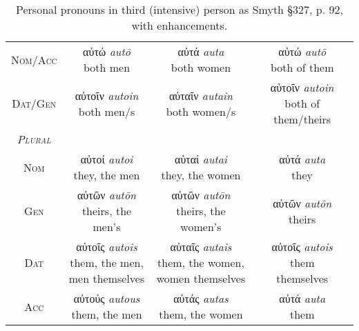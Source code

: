 \documentclass[10pt]{memoir}
\newcommand{\tsc}[1]{\textsc{#1}}
\newcommand{\grc}[1]{\fontspec{Inter}#1}
\newcommand{\trc}[1]{\textit{\fontspec{Tinos}#1}}
\begin{document}
\begin{table}[H]
\begin{tabular}{c|ccc}
            \tsc{Nom/Acc} & \makecell{\grc{αὐτώ} \trc{autō} \\ \small both men} & \makecell{\grc{αὐτά} \trc{auta} \\ \small both women} & \makecell{\grc{αὐτώ} \trc{autō} \\ \small both of them} \\
            \tsc{Dat/Gen} & \makecell{\grc{αὐτοῖν} \trc{autoin} \\ \small both men/s} & \makecell{\grc{αὐταῖν} \trc{autain} \\ \small both women/s} & \makecell{\grc{αὐτοῖν} \trc{autoin} \\ \small both of them/theirs} \\
            \hline
            \emph{\tsc{Plural}} \\
            \tsc{Nom} & \makecell{\grc{αὐτοί} \trc{autoi} \\ \small they, the men} & \makecell{\grc{αὐταί} \trc{autai} \\ \small they, the women} & \makecell{\grc{αὐτά} \trc{auta} \\ \small they} \\
            \tsc{Gen} & \makecell{\grc{αὐτῶν} \trc{autōn} \\ \small theirs, the men's} & \makecell{\grc{αὐτῶν} \trc{autōn} \\ \small theirs, the women's} & \makecell{\grc{αὐτῶν} \trc{autōn} \\ \small theirs} \\
            \tsc{Dat} & \makecell{\grc{αὐτοῖς} \trc{autois} \\ \small them, the men, \\ \small men themselves} & \makecell{\grc{αὐταῖς} \trc{autais}\\ \small them, the women, \\ \small women themselves} & \makecell{\grc{αὐτοῖς} \trc{autois} \\ \small them \\ \small themselves} \\
            \tsc{Acc} & \makecell{\grc{αὐτούς} \trc{autous} \\ \small them, the men} & \makecell{\grc{αὐτάς} \trc{autas} \\ \small them, the women} & \makecell{\grc{αὐτά} \trc{auta} \\ \small them} \\
        \end{tabular}
        \caption{Personal pronouns in third (intensive) person as Smyth §327, p. 92, with enhancements.}
    \end{table}
\end{document}
